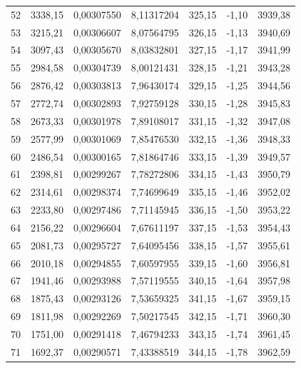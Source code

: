 \documentclass[12pt,a4paper,final,twoside,fleqn]{article}
\begin{document}
\begin{ThreePartTable}
\begin{longtable}{rrrrrrr}
52           & 3338,15   & 0,00307550    & 8,11317204  & 325,15     & -1,10      & 3939,38 \\
53           & 3215,21   & 0,00306607    & 8,07564795  & 326,15     & -1,13      & 3940,69 \\
54           & 3097,43   & 0,00305670    & 8,03832801  & 327,15     & -1,17      & 3941,99 \\
55           & 2984,58   & 0,00304739    & 8,00121431  & 328,15     & -1,21      & 3943,28 \\
56           & 2876,42   & 0,00303813    & 7,96430174  & 329,15     & -1,25      & 3944,56 \\
57           & 2772,74   & 0,00302893    & 7,92759128  & 330,15     & -1,28      & 3945,83 \\
58           & 2673,33   & 0,00301978    & 7,89108017  & 331,15     & -1,32      & 3947,08 \\
59           & 2577,99   & 0,00301069    & 7,85476530  & 332,15     & -1,36      & 3948,33 \\
60           & 2486,54   & 0,00300165    & 7,81864746  & 333,15     & -1,39      & 3949,57 \\
61           & 2398,81   & 0,00299267    & 7,78272806  & 334,15     & -1,43      & 3950,79 \\
62           & 2314,61   & 0,00298374    & 7,74699649  & 335,15     & -1,46      & 3952,02 \\
63           & 2233,80   & 0,00297486    & 7,71145945  & 336,15     & -1,50      & 3953,22 \\
64           & 2156,22   & 0,00296604    & 7,67611197  & 337,15     & -1,53      & 3954,43 \\
65           & 2081,73   & 0,00295727    & 7,64095456  & 338,15     & -1,57      & 3955,61 \\
66           & 2010,18   & 0,00294855    & 7,60597955  & 339,15     & -1,60      & 3956,81 \\
67           & 1941,46   & 0,00293988    & 7,57119555  & 340,15     & -1,64      & 3957,98 \\
68           & 1875,43   & 0,00293126    & 7,53659325  & 341,15     & -1,67      & 3959,15 \\
69           & 1811,98   & 0,00292269    & 7,50217545  & 342,15     & -1,71      & 3960,30 \\
70           & 1751,00   & 0,00291418    & 7,46794233  & 343,15     & -1,74      & 3961,45 \\
71           & 1692,37   & 0,00290571    & 7,43388519  & 344,15     & -1,78      & 3962,59 \\

\end{longtable}
\end{ThreePartTable}
\end{document}
